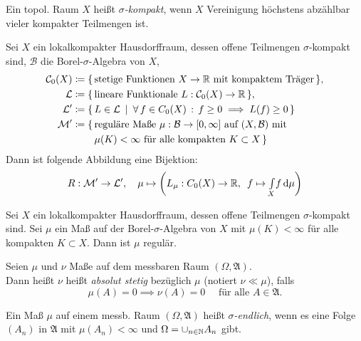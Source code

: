 \documentclass{cheat-sheet}
\newcommand{\Bor}{\mathcal{B}} %
\newcommand{\Lin}{\mathcal{L}} %
\newcommand{\Cont}{\mathcal{C}} %
\newcommand{\Alg}{\mathfrak{A}} %
\newcommand{\Meas}{\mathcal{M}} %
\begin{document}
\begin{defn}
  Ein topol. Raum $X$ heißt \emph{$\sigma$-kompakt}, wenn $X$ Vereinigung höchstens abzählbar vieler kompakter Teilmengen ist.
\end{defn}

\begin{thm}
  Sei $X$ ein lokalkompakter Hausdorffraum, dessen offene Teilmengen $\sigma$-kompakt sind, $\Bor$ die Borel-$\sigma$-Algebra von $X$,
  \begin{align*}
    \Cont_0(X) \coloneqq \{ \, & \text{stetige Funktionen $X \to \R$ mit kompaktem Träger} \, \}, \\
    \Lin \coloneqq \{ \, & \text{lineare Funktionale $L : \Cont_0(X) \to \R$} \, \}, \\
    \Lin' \coloneqq \{ \, & L \in \Lin \enspace|\enspace \fa{f \in C_0(X)} f \geq 0 \implies L(f) \geq 0 \, \} \\
    \Meas' \coloneqq \{ \, & \text{reguläre Maße $\mu : \Bor \to \cinterval{0}{\infty}$ auf $(X, \Bor)$ mit} \\
    & \text{$\mu(K) < \infty$ für alle kompakten $K \subset X$} \, \}
  \end{align*}
  Dann ist folgende Abbildung eine Bijektion:
  \[ R : \Meas' \to \Lin', \quad \mu \mapsto \left( L_\mu : C_0(X) \to \R, \enspace f \mapsto \Int{X}{}{f}{\mu} \right) \]
\end{thm}

\begin{thm}
  Sei $X$ ein lokalkompakter Hausdorffraum, dessen offene Teilmengen $\sigma$-kompakt sind.
  Sei $\mu$ ein Maß auf der Borel-$\sigma$-Algebra von $X$ mit $\mu(K) \!<\! \infty$ für alle kompakten $K \!\subset\! X$. Dann ist $\mu$ regulär.
\end{thm}

\begin{defn}
  Seien $\mu$ und $\nu$ Maße auf dem messbaren Raum $(\Omega, \Alg)$. \\
  Dann heißt $\nu$ heißt \emph{absolut stetig} bezüglich $\mu$ (notiert $\nu \ll \mu$), falls
  \[ \mu(A) = 0 \implies \nu(A) = 0 \quad \text{ für alle } A \in \Alg. \]
\end{defn}

\begin{defn}
  Ein Maß $\mu$ auf einem messb. Raum $(\Omega, \Alg)$ heißt \emph{$\sigma$-endlich}, wenn es eine Folge $(A_n)$ in $\Alg$ mit $\mu(A_n) < \infty$ und $\Omega = \cup_{n \in \mathbb{N}} A_n$ gibt.
\end{defn}
\end{document}
